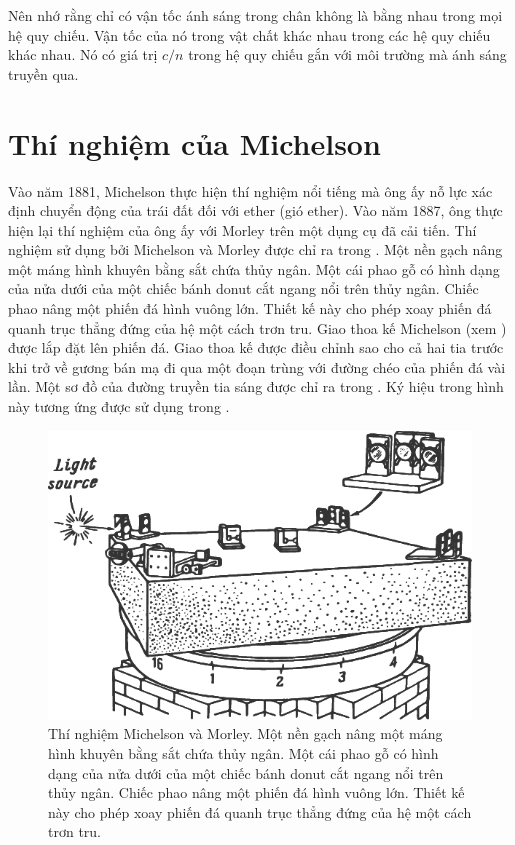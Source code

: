 Nên nhớ rằng chỉ có vận tốc ánh sáng trong chân không là bằng nhau trong mọi hệ quy chiếu.
Vận tốc của nó trong vật chất khác nhau trong các hệ quy chiếu khác nhau.
Nó có giá trị $c/n$ trong hệ quy chiếu gắn với môi trường mà ánh sáng truyền qua.

\section{Thí nghiệm của Michelson}\label{sec:21_3}

Vào năm 1881, Michelson thực hiện thí nghiệm nổi tiếng mà ông ấy nỗ lực xác định chuyển động của trái đất đối với ether (gió ether).
Vào năm 1887, ông thực hiện lại thí nghiệm của ông ấy với Morley trên một dụng cụ đã cải tiến.
Thí nghiệm sử dụng bởi Michelson và Morley được chỉ ra trong .
Một nền gạch nâng một máng hình khuyên bằng sắt chứa thủy ngân.
Một cái phao gỗ có hình dạng của nửa dưới của một chiếc bánh donut cắt ngang nổi trên thủy ngân.
Chiếc phao nâng một phiến đá hình vuông lớn.
Thiết kế này cho phép xoay phiến đá quanh trục thẳng đứng của hệ một cách trơn tru.
Giao thoa kế Michelson (xem ) được lắp đặt lên phiến đá.
Giao thoa kế được điều chỉnh sao cho cả hai tia trước khi trở về gương bán mạ đi qua một đoạn trùng với đường chéo của phiến đá vài lần.
Một sơ đồ của đường truyền tia sáng được chỉ ra trong .
Ký hiệu trong hình này tương ứng được sử dụng trong .

\begin{figure}[!htb]
	\begin{center}
		\includegraphics[scale=1]{figures/ch_21/fig_21_4.pdf}
        \caption[]{Thí nghiệm Michelson và Morley. Một nền gạch nâng một máng hình khuyên bằng sắt chứa thủy ngân. Một cái phao gỗ có hình dạng của nửa dưới của một chiếc bánh donut cắt ngang nổi trên thủy ngân. Chiếc phao nâng một phiến đá hình vuông lớn. Thiết kế này cho phép xoay phiến đá quanh trục thẳng đứng của hệ một cách trơn tru.}
		\label{fig:21_4}
	\end{center}
	\vspace{-0.8cm}
\end{figure}

